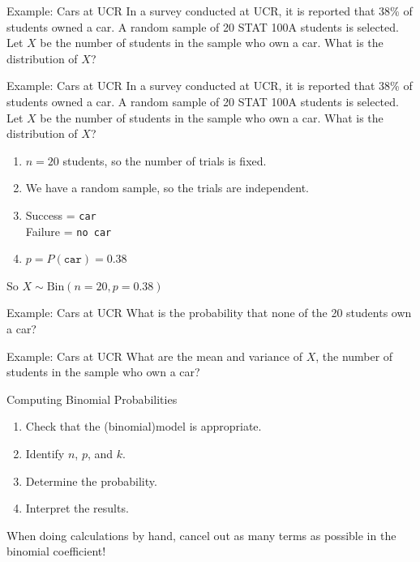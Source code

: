 \begin{frame}{Example: Cars at UCR}
    In a survey conducted at UCR, it is reported that 38\% of students owned a car. A random sample of 20 STAT 100A students is selected. Let $X$ be the number of students in the sample who own a car. What is the distribution of $X$?
\end{frame}

\begin{frame}{Example: Cars at UCR}
    In a survey conducted at UCR, it is reported that 38\% of students owned a car. A random sample of 20 STAT 100A students is selected. Let $X$ be the number of students in the sample who own a car. What is the distribution of $X$?
    
    \begin{enumerate}
        \item $n=20$ students, so the number of trials is fixed.
        \item We have a random sample, so the trials are independent.
        \item Success = \texttt{car} \\ Failure = \texttt{no car}
        \item $p = P(\texttt{car}) = 0.38$
    \end{enumerate}
    So $X\sim\text{Bin}(n=20,p=0.38)$
\end{frame}

\begin{frame}{Example: Cars at UCR}
    What is the probability that none of the 20 students own a car?
\end{frame}

\begin{frame}{Example: Cars at UCR}
    What are the mean and variance of $X$, the number of students in the sample who own a car?
\end{frame}

\begin{frame}{Computing Binomial Probabilities}
    \begin{enumerate}
        \item Check that the (binomial)model is appropriate.
        \item Identify $n$, $p$, and $k$.
        \item Determine the probability.
        \item Interpret the results.
    \end{enumerate}
    
    When doing calculations by hand, cancel out as many terms as possible in the binomial coefficient!
\end{frame}


